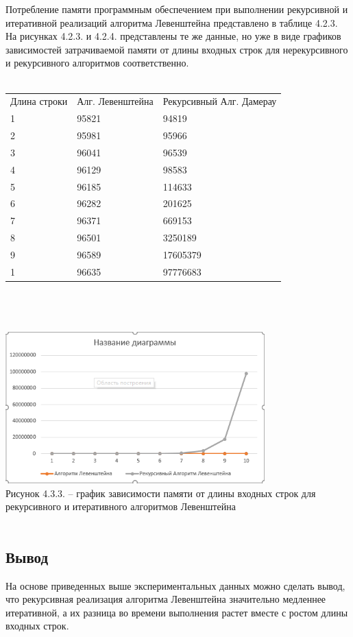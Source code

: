 \documentclass{article}
\begin{document}
Потребление памяти программным обеспечением при выполнении рекурсивной и итеративной реализаций алгоритма Левенштейна представлено в таблице 4.2.3. На рисунках 4.2.3. и 4.2.4. представлены те же данные, но уже в виде графиков зависимостей затрачиваемой памяти от длины входных строк для нерекурсивного и рекурсивного алгоритмов соответственно.\\\\
\begin{tabular}{ | l | l | l |}
Длина строки  & Алг. Левенштейна & Рекурсивный Алг. Дамерау  \\
1 & 95821 & 94819 \\
2 & 95981 & 95966   \\
3 & 96041 & 96539 \\
4 & 96129 & 98583  \\
5 & 96185 & 114633\\
6 & 96282 & 201625 \\
7 & 96371 & 669153  \\
8 & 96501 & 3250189  \\
9 & 96589 & 17605379 \\
1 & 96635 & 97776683 \\
\end{tabular}\\
\\
\\
\small 
	\includegraphics[width=10cm]{g3}\\
	Рисунок 4.3.3. – график зависимости памяти от длины входных строк для рекурсивного  и итеративного алгоритмов Левенштейна 
\normalsize
\\\\

\subsection{Вывод}
\label{sec:experiment:con}
На основе приведенных выше экспериментальных данных можно сделать вывод, что рекурсивная реализация алгоритма Левенштейна значительно медленнее итеративной, а их разница во времени выполнения растет вместе с ростом длины входных строк. 
\end{document}
